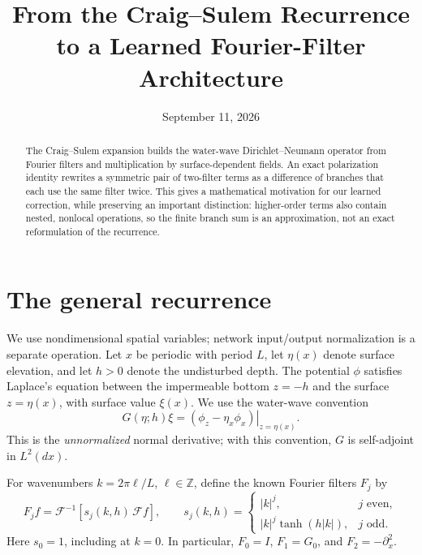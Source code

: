 \documentclass[11pt,letterpaper]{article}
\title{From the Craig--Sulem Recurrence\\
to a Learned Fourier-Filter Architecture}
\author{}
\date{September 11, 2026}
\begin{document}
\maketitle

\begin{abstract}
The Craig--Sulem expansion builds the water-wave Dirichlet--Neumann operator
from Fourier filters and multiplication by surface-dependent fields. An exact
polarization identity rewrites a symmetric pair of two-filter terms as a
difference of branches that each use the same filter twice. This gives a
mathematical motivation for our learned correction, while preserving an
important distinction: higher-order terms also contain nested, nonlocal
operations, so the finite branch sum is an approximation, not an exact
reformulation of the recurrence.
\end{abstract}

\section{The general recurrence}

We use nondimensional spatial variables; network input/output normalization
is a separate operation. Let $x$ be periodic with period $L$, let $\eta(x)$ denote surface elevation,
and let $h>0$ denote the undisturbed depth. The potential $\phi$ satisfies
Laplace's equation between the impermeable bottom $z=-h$ and the surface
$z=\eta(x)$, with surface value $\xi(x)$. We use the water-wave convention
\begin{equation}
  G(\eta;h)\xi
  =\left.(\phi_z-\eta_x\phi_x)\right|_{z=\eta(x)}.
  \label{eq:dno}
\end{equation}
This is the \emph{unnormalized} normal derivative; with this convention,
$G$ is self-adjoint in $L^2(dx)$.

For wavenumbers $k=2\pi\ell/L$, $\ell\in\mathbb Z$, define the known Fourier
filters $F_j$ by
\begin{equation}
  F_j f=\mathcal F^{-1}\!\left[s_j(k,h)\,\mathcal F f\right],
  \qquad
  s_j(k,h)=
  \begin{cases}
    |k|^j, & j\text{ even},\\
    |k|^j\tanh(h|k|), & j\text{ odd}.
  \end{cases}
  \label{eq:known-filters}
\end{equation}
Here $s_0=1$, including at $k=0$. In particular,
$F_0=I$, $F_1=G_0$, and $F_2=-\partial_x^2$.
\end{document}
